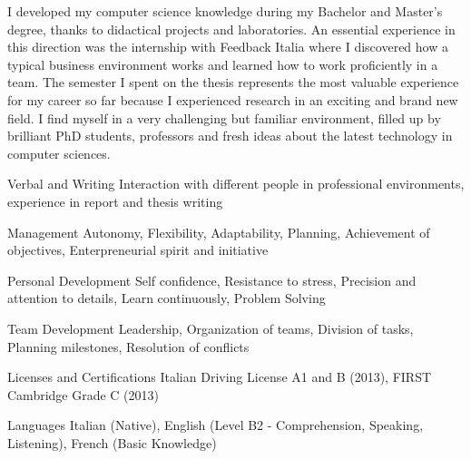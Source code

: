 {\begin{cvskills}
\end{cvskills}
\vspace{-5mm}
\begin{cvparagraph}
I developed my computer science knowledge during my Bachelor and Master's degree, thanks to didactical projects and laboratories.
An essential experience in this direction was the internship with Feedback Italia where I discovered how a typical business environment works and learned how to work proficiently in a team.
The semester I spent on the thesis represents the most valuable experience for my career so far because I experienced research in an exciting and brand new field.
I find myself in a very challenging but familiar environment, filled up by brilliant PhD students, professors and fresh ideas about the latest technology in computer sciences.
\end{cvparagraph}
\vspace{-3mm}
\begin{cvskills}

\cvskill
{Verbal and Writing} %
{Interaction with different people in professional environments, experience in report and thesis writing} %

\cvskill
{Management} %
{Autonomy, Flexibility, Adaptability, Planning, Achievement of objectives, Enterpreneurial spirit and initiative} %

\cvskill
{Personal Development} %
{Self confidence, Resistance to stress, Precision and attention to details, Learn continuously, Problem Solving} %

\cvskill
{Team Development} %
{Leadership, Organization of teams, Division of tasks, Planning milestones, Resolution of conflicts} %



\cvskill
{Licenses and Certifications} %
{Italian Driving License A1 and B (2013), FIRST Cambridge Grade C (2013)} %


\cvskill
{Languages} %
{Italian (Native), English (Level B2 - Comprehension, Speaking, Listening), French (Basic Knowledge)} %


\end{cvskills}}
